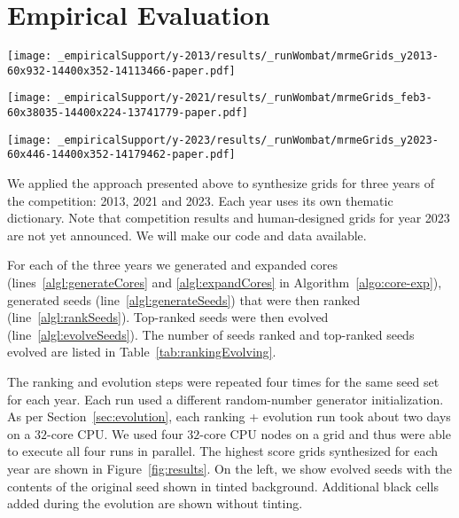 \section{Empirical Evaluation}


\begin{figure*}[th]
\centering
\texttt{[image: \_empiricalSupport/y-2013/results/\_runWombat/mrmeGrids\_y2013-60x932-14400x352-14113466-paper.pdf]}

\vspace{0.15cm}

\texttt{[image: \_empiricalSupport/y-2021/results/\_runWombat/mrmeGrids\_feb3-60x38035-14400x224-13741779-paper.pdf]}

\vspace{0.15cm}

\texttt{[image: \_empiricalSupport/y-2023/results/\_runWombat/mrmeGrids\_y2023-60x446-14400x352-14179462-paper.pdf]}

\caption{Our top results for years 2013 (top row), 2021 (middle) and 2023 (bottom). Left: seeds after
placing additional black cells. Right: {\sc Wombat} solutions.}
\label{fig:results}
\end{figure*}

We applied the approach presented above to synthesize grids for three years of the competition: 2013, 2021 and 2023. Each year uses its own thematic dictionary. Note that competition results and human-designed grids for year 2023 are not yet announced.
We will make our code and data available.


For each of the three years we generated and expanded cores (lines~\ref{algl:generateCores} and \ref{algl:expandCores} in Algorithm~\ref{algo:core-exp}), generated seeds (line~\ref{algl:generateSeeds}) that were then ranked (line~\ref{algl:rankSeeds}). Top-ranked seeds were then evolved (line~\ref{algl:evolveSeeds}). The number of seeds ranked and top-ranked seeds evolved are listed in Table~\ref{tab:rankingEvolving}.


The ranking and evolution steps were repeated four times for the same seed set for each year. Each run used a different random-number generator initialization. As per Section~\ref{sec:evolution}, each ranking + evolution run took about two days on a $32$-core CPU. We used four $32$-core CPU nodes on a grid and thus were able to execute all four runs in parallel. The highest score grids synthesized for each year are shown in Figure~\ref{fig:results}. On the left, we show evolved seeds with the contents of the original seed shown in tinted background. Additional black cells added during the evolution are shown without tinting.

